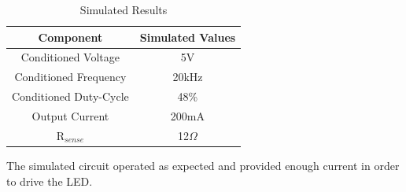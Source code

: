 \begin{table}[H]
	\centering
\caption{Simulated Results}
\label{tab:simresults}
\begin{tabular}{|c|c|}
	\hline 
	Component & Simulated Values \\ 
	\hline 
	Conditioned Voltage & 5V \\ 
	\hline 
	Conditioned Frequency & 20kHz \\ 
	\hline 
	Conditioned Duty-Cycle & 48\% \\ 
	\hline 
	Output Current & 200mA \\ 
	\hline 
	R$_{sense}$ & 12$\Omega$ \\ 
	\hline 
\end{tabular} 
\end{table}

The simulated circuit operated as expected and provided enough current in order to drive the LED.
	






